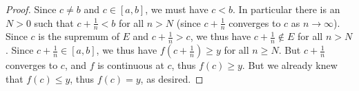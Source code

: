 \begin{proof}
    Since \(c \neq b\) and \(c \in [a, b]\), we must have \(c < b\).
    In particular there is an \(N > 0\) such that \(c + \frac{1}{n} < b\) for all \(n > N\)
    (since \(c + \frac{1}{n}\) converges to \(c\) as \(n \to \infty\)).
    Since \(c\) is the supremum of \(E\) and \(c + \frac{1}{n} > c\), we thus have \(c + \frac{1}{n} \notin E\) for all \(n > N\).
    Since \(c + \frac{1}{n} \in [a, b]\), we thus have \(f(c + \frac{1}{n}) \geq y\) for all \(n \geq N\).
    But \(c + \frac{1}{n}\) converges to \(c\), and \(f\) is continuous at \(c\), thus \(f(c) \geq y\).
    But we already knew that \(f(c) \leq y\), thus \(f(c) = y\), as desired.
\end{proof}